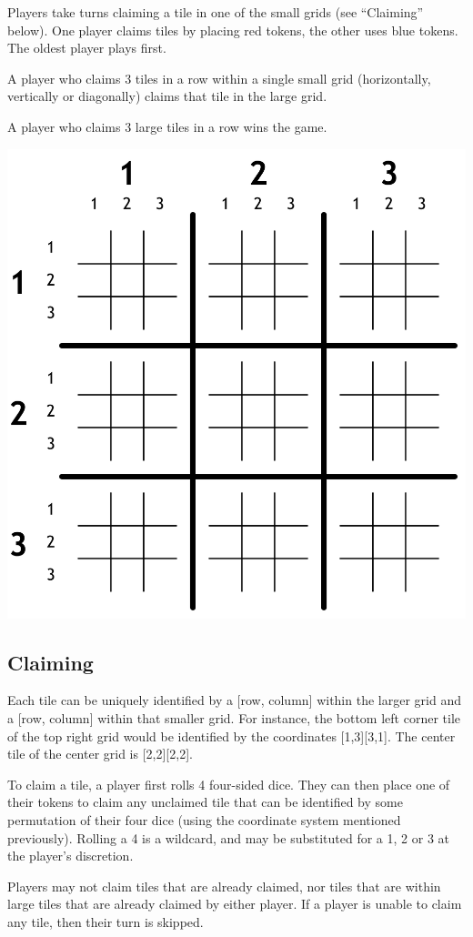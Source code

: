\documentclass{article}
\begin{document}
Players take turns claiming a tile in one of the small grids (see ``Claiming'' below). One player claims tiles by placing red tokens, the other uses blue tokens. The oldest player plays first.

A player who claims 3 tiles in a row within a single small grid (horizontally, vertically or diagonally) claims that tile in the large grid.

A player who claims 3 large tiles in a row wins the game.

\begin{center}
\includegraphics[width=0.7\linewidth]{diagram}
\end{center}

\subsection{Claiming}
Each tile can be uniquely identified by a [row, column] within the larger grid and a [row, column] within that smaller grid. For instance, the bottom left corner tile of the top right grid would be identified by the coordinates [1,3][3,1]. The center tile of the center grid is [2,2][2,2].

To claim a tile, a player first rolls 4 four-sided dice. They can then place one of their tokens to claim any unclaimed tile that can be identified by some permutation of their four dice (using the coordinate system mentioned previously). Rolling a 4 is a wildcard, and may be substituted for a 1, 2 or 3 at the player's discretion.

Players may not claim tiles that are already claimed, nor tiles that are within large tiles that are already claimed by either player. If a player is unable to claim any tile, then their turn is skipped.
\end{document}
